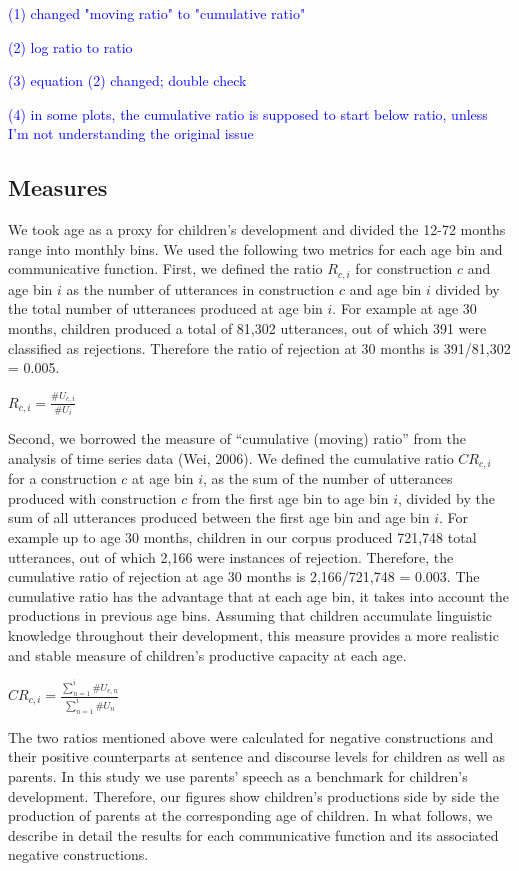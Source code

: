 \documentclass[
  english,
  man,floatsintext]{apa6}
\begin{document}
\textcolor{blue}{(1) changed "moving ratio" to "cumulative ratio"}

\textcolor{blue}{(2) log ratio to ratio}

\textcolor{blue}{(3) equation (2) changed; double check}

\textcolor{blue}{(4) in some plots, the cumulative ratio is supposed to start below ratio, unless I'm not understanding the original issue}

\hypertarget{measures}{%
\subsection{Measures}\label{measures}}

We took age as a proxy for children's development and divided the 12-72 months range into monthly bins. We used the following two metrics for each age bin and communicative function. First, we defined the ratio \(R_{c,i}\) for construction \(c\) and age bin \(i\) as the number of utterances in construction \(c\) and age bin \(i\) divided by the total number of utterances produced at age bin \(i\). For example at age 30 months, children produced a total of 81,302 utterances, out of which 391 were classified as rejections. Therefore the ratio of rejection at 30 months is 391/81,302 = 0.005.

\(R_{c, i} = \frac{\#U_{c,i}}{\#U_{i}}\)

Second, we borrowed the measure of ``cumulative (moving) ratio'' from the analysis of time series data (Wei, 2006). We defined the cumulative ratio \(CR_{c,i}\) for a construction \(c\) at age bin \(i\), as the sum of the number of utterances produced with construction \(c\) from the first age bin to age bin \(i\), divided by the sum of all utterances produced between the first age bin and age bin \(i\). For example up to age 30 months, children in our corpus produced 721,748 total utterances, out of which 2,166 were instances of rejection. Therefore, the cumulative ratio of rejection at age 30 months is 2,166/721,748 = 0.003. The cumulative ratio has the advantage that at each age bin, it takes into account the productions in previous age bins. Assuming that children accumulate linguistic knowledge throughout their development, this measure provides a more realistic and stable measure of children's productive capacity at each age.

\(CR_{c, i} = \frac{\sum_{n=1}^{i} \#U_{c,n}}{\sum_{n=1}^{i} \#U_{n}}\)

The two ratios mentioned above were calculated for negative constructions and their positive counterparts at sentence and discourse levels for children as well as parents. In this study we use parents' speech as a benchmark for children's development. Therefore, our figures show children's productions side by side the production of parents at the corresponding age of children. In what follows, we describe in detail the results for each communicative function and its associated negative constructions.
\end{document}
